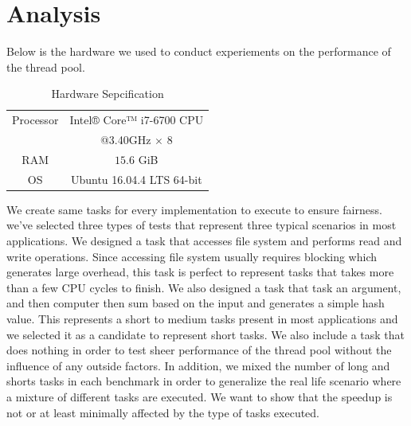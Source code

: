 \documentclass[journal, a4paper]{IEEEtran}
\begin{document}
\section{Analysis}
Below is the hardware we used to conduct experiements on the performance of the thread pool.
	\begin{table}[!hbt]
	\begin{center}
		\caption{Hardware Sepcification}
		\label{tab:simParameters}
		\begin{tabular}{|c|c|}
			\hline
			Processor & Intel® Core™ i7-6700 CPU \\
								&@3.40GHz $\times$ 8\\
			\hline
			RAM & $15.6$ GiB \\
			\hline
			OS & Ubuntu 16.04.4 LTS 64-bit\\
			\hline
		\end{tabular}
		\end{center}
	\end{table}

We create same tasks for every implementation to execute to ensure fairness. we've selected three types of tests that represent three typical scenarios in most applications. We designed a task that accesses file system and performs read and write operations. Since accessing file system usually requires blocking which generates large overhead, this task is perfect to represent tasks that takes more than a few CPU cycles to finish. We also designed a task that task an argument, and then computer then sum based on the input and generates a simple hash value. This represents a short to medium tasks present in most applications and we selected it as a candidate to represent short tasks. We also include a task that does nothing in order to test sheer performance of the thread pool without the influence of any outside factors. In addition, we mixed the number of long and shorts tasks in each benchmark in order to generalize the real life scenario where a mixture of different tasks are executed. We want to show that the speedup is not or at least minimally affected by the type of tasks executed.\\
\end{document}
